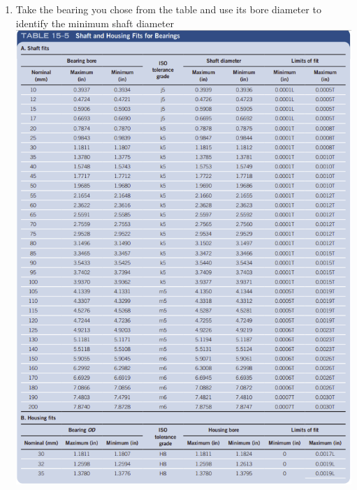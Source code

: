 \documentclass[11pt, fleqn]{article}
\begin{document}
\begin{enumerate}
    \item Take the bearing you chose from the table and use its bore diameter to identify the minimum shaft diameter\\
    \includegraphics[scale=1]{Shafts/Tab15-5a.png}\\

\end{enumerate}
\end{document}
